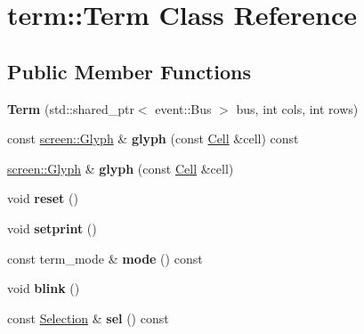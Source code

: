 \hypertarget{classterm_1_1Term}{}\section{term\+::Term Class Reference}
\label{classterm_1_1Term}
\subsection*{Public Member Functions}
\begin{DoxyCompactItemize}
\item 
\mbox{\label{classterm_1_1Term_a3896ddcd8c9a982569962643c917ba5f}} 
{\bfseries Term} (std\+::shared\+\_\+ptr$<$ event\+::\+Bus $>$ bus, int cols, int rows)
\item 
\mbox{\label{classterm_1_1Term_af3849099dec24f31d44ff9c749621058}} 
const \mbox{\hyperlink{structscreen_1_1Glyph}{screen\+::\+Glyph}} \& {\bfseries glyph} (const \mbox{\hyperlink{structCell}{Cell}} \&cell) const
\item 
\mbox{\label{classterm_1_1Term_a541263e9aa312385aea9b2c5b23adfb3}} 
\mbox{\hyperlink{structscreen_1_1Glyph}{screen\+::\+Glyph}} \& {\bfseries glyph} (const \mbox{\hyperlink{structCell}{Cell}} \&cell)
\item 
\mbox{\label{classterm_1_1Term_a10b96f0a38bf4472e7af4f313a3f5c34}} 
void {\bfseries reset} ()
\item 
\mbox{\label{classterm_1_1Term_a0b1aec92909fa6879fb77eaaabb34c34}} 
void {\bfseries setprint} ()
\item 
\mbox{\label{classterm_1_1Term_a4819a4d63b495e053f48c8d76bc4b50b}} 
const term\+\_\+mode \& {\bfseries mode} () const
\item 
\mbox{\label{classterm_1_1Term_af9b07b36549ec714a1975683e6651e1b}} 
void {\bfseries blink} ()
\item 
\mbox{\label{classterm_1_1Term_a155f4c07592de0603c6c2fd86dafff97}} 
const \mbox{\hyperlink{classSelection}{Selection}} \& {\bfseries sel} () const
\item 

\end{DoxyCompactItemize}
